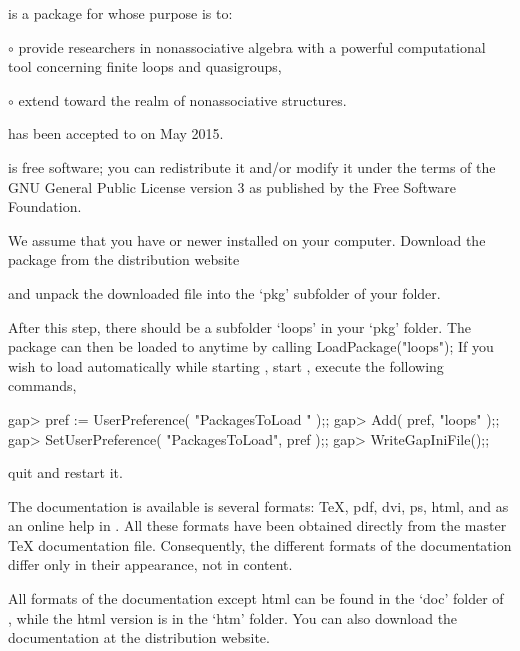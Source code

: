 
{\LOOPS} is a package for  whose purpose is to:
\beginlist%
\item{$\circ$}
    provide researchers in nonassociative algebra with a powerful computational tool
    concerning finite loops and quasigroups,
\item{$\circ$}
    extend {\GAP} toward the realm of nonassociative structures.
\endlist

{\LOOPS} has been accepted to {\GAP} on May 2015.


{\LOOPS} is free software; you can redistribute it and/or modify it under the terms of the GNU General Public License version 3 as published by the Free Software Foundation.


We assume that you have  or newer installed on your computer.
Download the {\LOOPS} package from the distribution website


and unpack the downloaded file into the `pkg' subfolder of your {\GAP} folder.

After this step, there should be a subfolder `loops' in your `pkg' folder. The
package {\LOOPS} can then be loaded to {\GAP} anytime by calling
\begintt
LoadPackage("loops");
\endtt
If you wish to load {\LOOPS} automatically while starting {\GAP}, start {\GAP}, execute the following commands,

\beginexample
gap> pref := UserPreference( "PackagesToLoad " );;
gap> Add( pref, "loops" );;
gap> SetUserPreference( "PackagesToLoad", pref );;
gap> WriteGapIniFile();;
\endexample

quit {\GAP} and restart it.


The documentation is available is several formats: \TeX, pdf, dvi, ps, html,
and as an online help in {\GAP}. All these formats have been obtained directly
from the master {\TeX} documentation file. Consequently, the different formats
of the documentation differ only in their appearance, not in content.

All formats of the documentation except html can be found in the `doc' folder
of {\LOOPS}, while the html version is in the `htm' folder. You can also
download the documentation at the {\LOOPS} distribution website.

